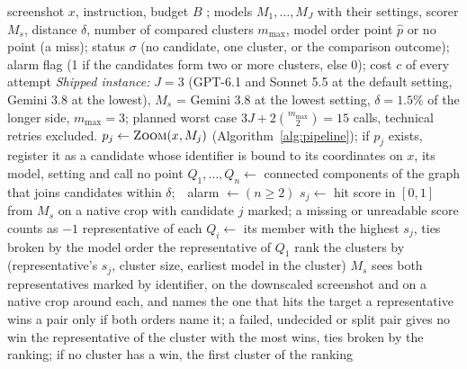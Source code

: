 \begin{algorithm*}[t]
\caption{GUI-grounding tier of FSR: clicks from several models. Called by Algorithm~\ref{alg:pipeline} only when the budget covers its planned worst case. Comments give the term of Proposition~\ref{prop:three} that each step acts on and the number of calls.}\label{alg:clicks}
\small
\begin{algorithmic}[1]
\Require screenshot $x$, instruction, budget $B$ ; models $M_1,\dots,M_J$ with their settings, scorer $M_s$, distance $\delta$, number of compared clusters $m_{\max}$, model order 
\Ensure point $\hat p$ or no point (a miss); status $\sigma$ (no candidate, one cluster, or the comparison outcome); alarm flag (1 if the candidates form two or more clusters, else 0); cost $c$ of every attempt
\Statex \emph{Shipped instance:} $J=3$ (GPT-6.1 and Sonnet 5.5 at the default setting, Gemini 3.8 at the lowest), $M_s$ = Gemini 3.8 at the lowest setting, $\delta=1.5\%$ of the longer side, $m_{\max}=3$; planned worst case $3J+2\binom{m_{\max}}{2}=15$ calls, technical retries excluded.
 
  \State $p_j\gets\textsc{Zoom}(x,M_j)$ (Algorithm~\ref{alg:pipeline}); if $p_j$ exists, register it as a candidate whose identifier is bound to its coordinates on $x$, its model, setting and call
\EndFor
{} \Return no point \EndIf
\State $Q_1,\dots,Q_n\gets$ connected components of the graph that joins candidates within $\delta$;\ \ alarm $\gets(n\ge2)$ 
 
  \State $s_j\gets$ hit score in $[0,1]$ from $M_s$ on a native crop with candidate $j$ marked; a missing or unreadable score counts as $-1$
\EndFor
\State representative of each $Q_i\gets$ its member with the highest $s_j$, ties broken by the model order
 \Return the representative of $Q_1$ 
\EndIf
\State rank the clusters by (representative's $s_j$, cluster size, earliest model in the cluster)
 
  \State $M_s$ sees both representatives marked by identifier, on the downscaled screenshot and on a native crop around each, and names the one that hits the target
\EndFor
\State a representative wins a pair only if both orders name it; a failed, undecided or split pair gives no win
\State \Return the representative of the cluster with the most wins, ties broken by the ranking; if no cluster has a win, the first cluster of the ranking
\end{algorithmic}
\end{algorithm*}

